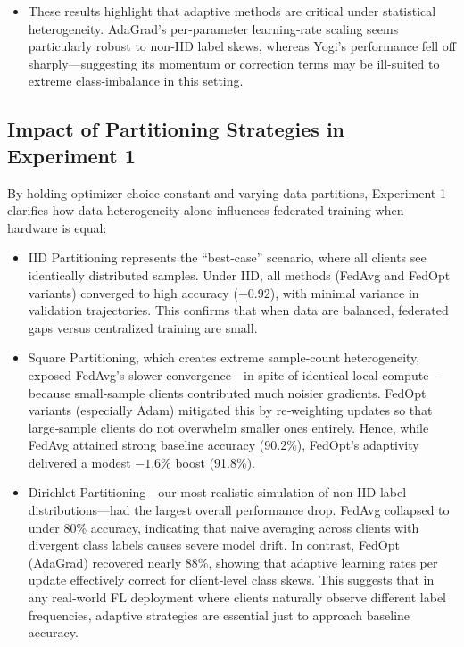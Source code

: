 \documentclass[11pt]{article}
\begin{document}
\begin{itemize}
\begin{itemize}
            \item These results highlight that adaptive methods are critical under statistical heterogeneity. AdaGrad’s per‐parameter learning‐rate scaling seems particularly robust to non‐IID label skews, whereas Yogi’s performance fell off sharply—suggesting its momentum or correction terms may be ill-suited to extreme class‐imbalance in this setting.
        \end{itemize}
    \end{itemize}

    \subsection{Impact of Partitioning Strategies in Experiment 1}
    By holding optimizer choice constant and varying data partitions, Experiment 1 clarifies how data heterogeneity alone influences federated training when hardware is equal:

    \begin{itemize}
        \item IID Partitioning represents the “best‐case” scenario, where all clients see identically distributed samples. Under IID, all methods (FedAvg and FedOpt variants) converged to high accuracy ($-0.92$), with minimal variance in validation trajectories. This confirms that when data are balanced, federated gaps versus centralized training are small.
        \item Square Partitioning, which creates extreme sample‐count heterogeneity, exposed FedAvg’s slower convergence—in spite of identical local compute—because small‐sample clients contributed much noisier gradients. FedOpt variants (especially Adam) mitigated this by re‐weighting updates so that large‐sample clients do not overwhelm smaller ones entirely. Hence, while FedAvg attained strong baseline accuracy (90.2\%), FedOpt’s adaptivity delivered a modest $-1.6\%$ boost (91.8\%).
        \item Dirichlet Partitioning—our most realistic simulation of non‐IID label distributions—had the largest overall performance drop. FedAvg collapsed to under 80\% accuracy, indicating that naive averaging across clients with divergent class labels causes severe model drift. In contrast, FedOpt (AdaGrad) recovered nearly 88\%, showing that adaptive learning rates per update effectively correct for client‐level class skews. This suggests that in any real‐world FL deployment where clients naturally observe different label frequencies, adaptive strategies are essential just to approach baseline accuracy.
    \end{itemize}
\end{document}
